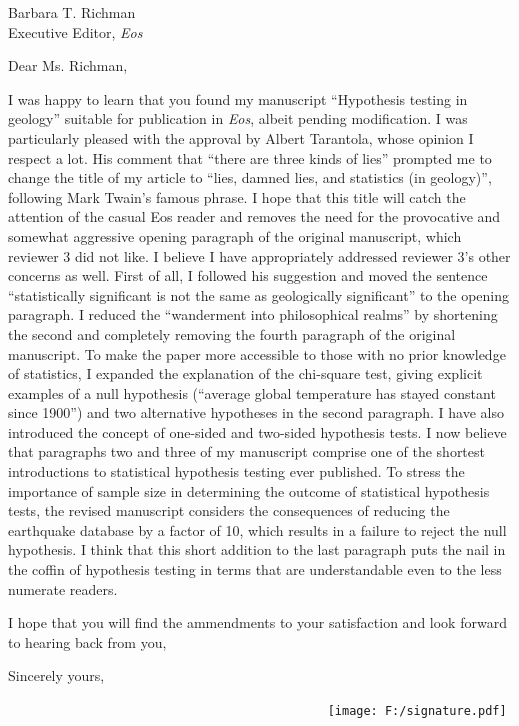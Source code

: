 \documentclass[a4]{letter}
\date{18 June 2009}
\begin{document}
\begin{letter}{Barbara T. Richman \\
Executive Editor, {\it Eos}}

\opening{Dear Ms. Richman,} 

I was happy to learn that you found my manuscript ``Hypothesis testing
in geology'' suitable for publication in {\it Eos}, albeit pending
modification. I was particularly pleased with the approval by Albert
Tarantola, whose opinion I respect a lot.  His comment that ``there
are three kinds of lies'' prompted me to change the title of my
article to ``lies, damned lies, and statistics (in geology)'',
following Mark Twain's famous phrase.  I hope that this title will
catch the attention of the casual Eos reader and removes the need for
the provocative and somewhat aggressive opening paragraph of the
original manuscript, which reviewer 3 did not like.  I believe I have
appropriately addressed reviewer 3's other concerns as well.  First of
all, I followed his suggestion and moved the sentence ``statistically
significant is not the same as geologically significant'' to the
opening paragraph. I reduced the ``wanderment into philosophical
realms'' by shortening the second and completely removing the fourth
paragraph of the original manuscript. To make the paper more
accessible to those with no prior knowledge of statistics, I expanded
the explanation of the chi-square test, giving explicit examples of a
null hypothesis (``average global temperature has stayed constant
since 1900'') and two alternative hypotheses in the second paragraph.
I have also introduced the concept of one-sided and two-sided
hypothesis tests. I now believe that paragraphs two and three of my
manuscript comprise one of the shortest introductions to statistical
hypothesis testing ever published. To stress the importance of sample
size in determining the outcome of statistical hypothesis tests, the
revised manuscript considers the consequences of reducing the
earthquake database by a factor of 10, which results in a failure to
reject the null hypothesis. I think that this short addition to the
last paragraph puts the nail in the coffin of hypothesis testing in
terms that are understandable even to the less numerate readers.

I hope that you will find the ammendments to your satisfaction and
look forward to hearing back from you,

\closing{Sincerely yours,}

~~~~~~~~~~~~~~~~~~~~~~~~~~~~~~~~~~~~~~~~~~~~~   
\texttt{[image: F:/signature.pdf]}

\end{letter}
\end{document}
